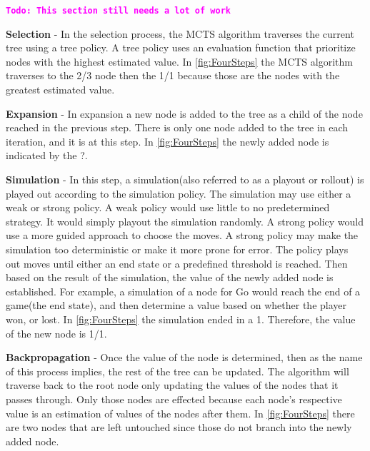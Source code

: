 \documentclass{sig-alternate}
\newcommand{\comment}[1]{{\bf \tt  {#1}}}
\newcommand{\todo}[1]{\textcolor{magenta}{\comment{Todo: {#1}}}}
\begin{document}
\todo{This section still needs a lot of work}

\textbf{Selection} - In the selection process, the MCTS algorithm traverses the current tree using a tree policy. A tree policy uses an evaluation function that prioritize nodes with the highest estimated value. In \ref{fig:FourSteps} the MCTS algorithm traverses to the 2/3 node then the 1/1 because those are the nodes with the greatest estimated value.

\textbf{Expansion} - In expansion a new node is added to the tree as a child of the node reached in the previous step. There is only one node added to the tree in each iteration, and it is at this step. In \ref{fig:FourSteps} the newly added node is indicated by the ?.

\textbf{Simulation} - In this step, a simulation(also referred to as a playout or rollout) is played out according to the simulation policy\cite{ActionSelection}. The simulation may use either a weak or strong policy. A weak policy would use little to no predetermined strategy. It would simply playout the simulation randomly. A strong policy would use a more guided approach to choose the moves. A strong policy may make the simulation too deterministic or make it more prone for error\cite{TheGrandChallenge}. The policy plays out moves until either an end state or a predefined threshold is reached. Then based on the result of the simulation, the value of the newly added node is established. For example, a simulation of a node for Go would reach the end of a game(the end state), and then determine a value based on whether the player won, or lost. In \ref{fig:FourSteps} the simulation ended in a 1. Therefore, the value of the new node is 1/1.

\textbf{Backpropagation} - Once the value of the node is determined, then as the name of this process implies, the rest of the tree can be updated. The algorithm will traverse back to the root node only updating the values of the nodes that it passes through. Only those nodes are effected because each node's respective value is an estimation of values of the nodes after them. In \ref{fig:FourSteps} there are two nodes that are left untouched since those do not branch into the newly added node.
\end{document}
